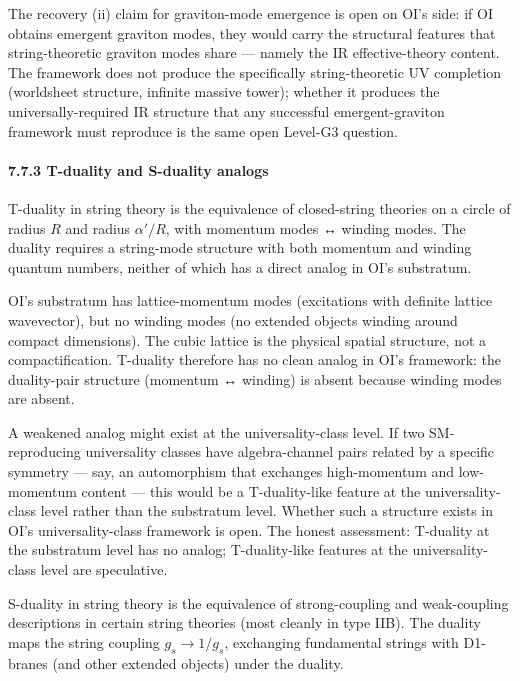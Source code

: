 \documentclass[
]{article}
\begin{document}
The recovery (ii) claim for graviton-mode emergence is open on OI's
side: if OI obtains emergent graviton modes, they would carry the
structural features that string-theoretic graviton modes share ---
namely the IR effective-theory content. The framework does not produce
the specifically string-theoretic UV completion (worldsheet structure,
infinite massive tower); whether it produces the universally-required IR
structure that any successful emergent-graviton framework must reproduce
is the same open Level-G3 question.

\hypertarget{t-duality-and-s-duality-analogs}{%
\paragraph{7.7.3 T-duality and S-duality
analogs}\label{t-duality-and-s-duality-analogs}}

T-duality in string theory is the equivalence of closed-string theories
on a circle of radius \(R\) and radius \(\alpha'/R\), with momentum
modes ↔ winding modes. The duality requires a string-mode structure with
both momentum and winding quantum numbers, neither of which has a direct
analog in OI's substratum.

OI's substratum has lattice-momentum modes (excitations with definite
lattice wavevector), but no winding modes (no extended objects winding
around compact dimensions). The cubic lattice is the physical spatial
structure, not a compactification. T-duality therefore has no clean
analog in OI's framework: the duality-pair structure (momentum ↔
winding) is absent because winding modes are absent.

A weakened analog might exist at the universality-class level. If two
SM-reproducing universality classes have algebra-channel pairs related
by a specific symmetry --- say, an automorphism that exchanges
high-momentum and low-momentum content --- this would be a
T-duality-like feature at the universality-class level rather than the
substratum level. Whether such a structure exists in OI's
universality-class framework is open. The honest assessment: T-duality
at the substratum level has no analog; T-duality-like features at the
universality-class level are speculative.

S-duality in string theory is the equivalence of strong-coupling and
weak-coupling descriptions in certain string theories (most cleanly in
type IIB). The duality maps the string coupling \(g_s \to 1/g_s\),
exchanging fundamental strings with D1-branes (and other extended
objects) under the duality.
\end{document}
